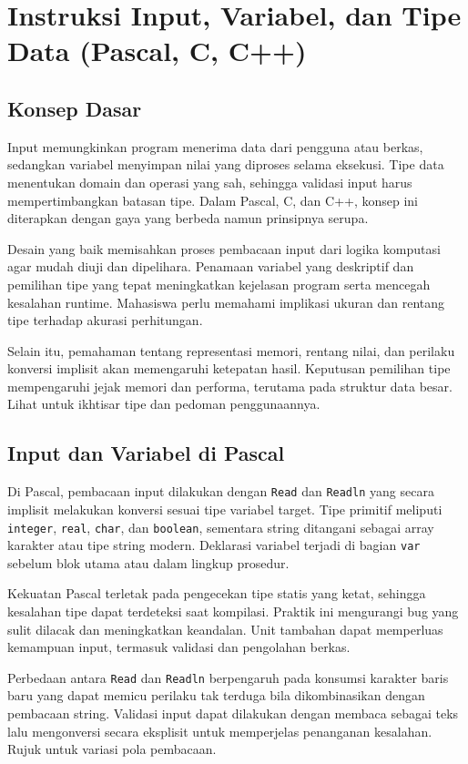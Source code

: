 \documentclass[../main.tex]{subfiles}
\begin{document}
\chapter{Instruksi Input, Variabel, dan Tipe Data (Pascal, C, C++)}
\section{Konsep Dasar}
Input memungkinkan program menerima data dari pengguna atau berkas, sedangkan variabel menyimpan nilai yang diproses selama eksekusi. Tipe data menentukan domain dan operasi yang sah, sehingga validasi input harus mempertimbangkan batasan tipe. Dalam Pascal, C, dan C++, konsep ini diterapkan dengan gaya yang berbeda namun prinsipnya serupa.

Desain yang baik memisahkan proses pembacaan input dari logika komputasi agar mudah diuji dan dipelihara. Penamaan variabel yang deskriptif dan pemilihan tipe yang tepat meningkatkan kejelasan program serta mencegah kesalahan runtime. Mahasiswa perlu memahami implikasi ukuran dan rentang tipe terhadap akurasi perhitungan.

Selain itu, pemahaman tentang representasi memori, rentang nilai, dan perilaku konversi implisit akan memengaruhi ketepatan hasil. Keputusan pemilihan tipe mempengaruhi jejak memori dan performa, terutama pada struktur data besar. Lihat \textcite{pascal-tutorial-wikibooks,gnu-c-manual,cpp-reference} untuk ikhtisar tipe dan pedoman penggunaannya.

\section{Input dan Variabel di Pascal}
Di Pascal, pembacaan input dilakukan dengan \texttt{Read} dan \texttt{Readln} yang secara implisit melakukan konversi sesuai tipe variabel target. Tipe primitif meliputi \texttt{integer}, \texttt{real}, \texttt{char}, dan \texttt{boolean}, sementara string ditangani sebagai array karakter atau tipe string modern. Deklarasi variabel terjadi di bagian \texttt{var} sebelum blok utama atau dalam lingkup prosedur.

Kekuatan Pascal terletak pada pengecekan tipe statis yang ketat, sehingga kesalahan tipe dapat terdeteksi saat kompilasi. Praktik ini mengurangi bug yang sulit dilacak dan meningkatkan keandalan. Unit tambahan dapat memperluas kemampuan input, termasuk validasi dan pengolahan berkas.

Perbedaan antara \texttt{Read} dan \texttt{Readln} berpengaruh pada konsumsi karakter baris baru yang dapat memicu perilaku tak terduga bila dikombinasikan dengan pembacaan string. Validasi input dapat dilakukan dengan membaca sebagai teks lalu mengonversi secara eksplisit untuk memperjelas penanganan kesalahan. Rujuk \textcite{free-pascal-docs,pascal-tutorial-wikibooks} untuk variasi pola pembacaan.
\end{document}
